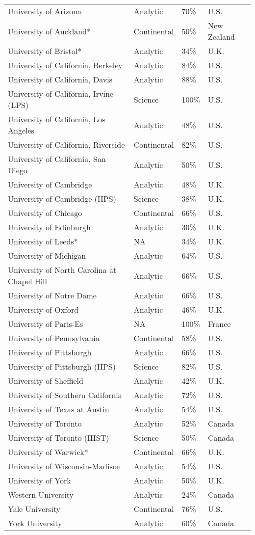 \begin{longtable}[t]{llll}
University of Arizona & Analytic & 70\% & U.S.\\
University of Auckland* & Continental & 50\% & New Zealand\\
\addlinespace
University of Bristol* & Analytic & 34\% & U.K.\\
University of California, Berkeley & Analytic & 84\% & U.S.\\
University of California, Davis & Analytic & 88\% & U.S.\\
University of California, Irvine (LPS) & Science & 100\% & U.S.\\
University of California, Los Angeles & Analytic & 48\% & U.S.\\
\addlinespace
University of California, Riverside & Continental & 82\% & U.S.\\
University of California, San Diego & Analytic & 50\% & U.S.\\
University of Cambridge & Analytic & 48\% & U.K.\\
University of Cambridge (HPS) & Science & 38\% & U.K.\\
University of Chicago & Continental & 66\% & U.S.\\
\addlinespace
University of Edinburgh & Analytic & 30\% & U.K.\\
University of Leeds* & NA & 34\% & U.K.\\
University of Michigan & Analytic & 64\% & U.S.\\
University of North Carolina at Chapel Hill & Analytic & 66\% & U.S.\\
University of Notre Dame & Analytic & 66\% & U.S.\\
\addlinespace
University of Oxford & Analytic & 46\% & U.K.\\
University of Paris-Es & NA & 100\% & France\\
University of Pennsylvania & Continental & 58\% & U.S.\\
University of Pittsburgh & Analytic & 66\% & U.S.\\
University of Pittsburgh (HPS) & Science & 82\% & U.S.\\
\addlinespace
University of Sheffield & Analytic & 42\% & U.K.\\
University of Southern California & Analytic & 72\% & U.S.\\
University of Texas at Austin & Analytic & 54\% & U.S.\\
University of Toronto & Analytic & 52\% & Canada\\
University of Toronto (IHST) & Science & 50\% & Canada\\
\addlinespace
University of Warwick* & Continental & 66\% & U.K.\\
University of Wisconsin-Madison & Analytic & 54\% & U.S.\\
University of York & Analytic & 50\% & U.K.\\
Western University & Analytic & 24\% & Canada\\
Yale University & Continental & 76\% & U.S.\\
\addlinespace
York University & Analytic & 60\% & Canada\\
\bottomrule
\end{longtable}